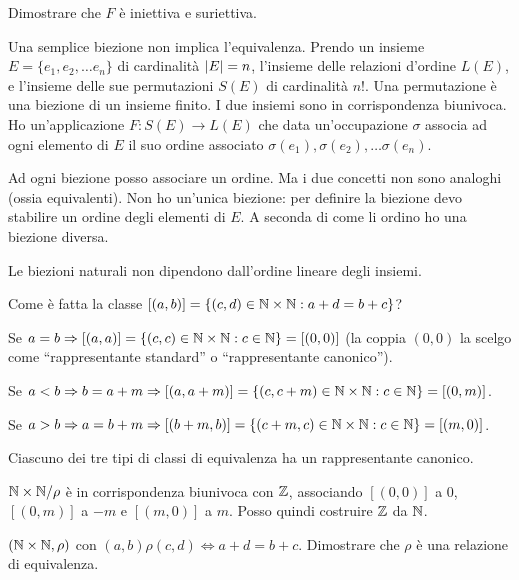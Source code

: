 \begin{esercizio}
Dimostrare che $F$ \`e iniettiva e suriettiva.
\end{esercizio}

Una semplice biezione non implica l'equivalenza. Prendo un insieme $E = \{e_1, e_2, \dots e_n\}$ di cardinalit\`a $\left\lvert{E}\right\rvert = n$, l'insieme delle relazioni d'ordine $L(E)$, e l'insieme delle sue permutazioni $S(E)$ di cardinalit\`a $n!$. Una permutazione \`e una biezione di un insieme finito. I due insiemi sono in corrispondenza biunivoca. Ho un'applicazione $F : S(E) \to L(E)$ che data un'occupazione $\sigma$ associa ad ogni elemento di $E$ il suo ordine associato $\sigma(e_1), \sigma(e_2), \dots \sigma(e_n)$. 

Ad ogni biezione posso associare un ordine. Ma i due concetti non sono analoghi (ossia equivalenti). Non ho un'unica biezione: per definire la biezione devo stabilire un ordine degli elementi di $E$. A seconda di come li ordino ho una biezione diversa.

\begin{defn}
Le biezioni naturali non dipendono dall'ordine lineare degli insiemi.
\end{defn}

Come \`e fatta la classe $[(a,b)] = \left \{ (c,d) \in \mathbb{N} \times \mathbb{N} : a + d = b + c \right\}$?

Se $a = b \Rightarrow [(a,a)] = \left \{ (c,c) \in \mathbb{N} \times \mathbb{N} : c \in \mathbb{N} \right\} = [(0,0)]$ (la coppia $(0,0)$ la scelgo come ``rappresentante standard'' o ``rappresentante canonico'').

Se $a < b \Rightarrow b = a + m \Rightarrow [(a,a+m)] = \left \{ (c, c + m) \in \mathbb{N} \times \mathbb{N} : c \in \mathbb{N}\right\} = [(0,m)]$.

Se $a > b \Rightarrow a = b + m \Rightarrow [(b + m, b)] = \left \{ (c + m, c) \in \mathbb{N} \times \mathbb{N} : c \in \mathbb{N}\right\} = [(m,0)]$.

Ciascuno dei tre tipi di classi di equivalenza ha un rappresentante canonico.

$\mathbb{N} \times \mathbb{N} / \rho$ \`e in corrispondenza biunivoca con $\mathbb{Z}$, associando $[(0,0)]$ a 0, $[(0,m)]$ a $-m$ e $[(m,0)]$ a $m$. Posso quindi costruire $\mathbb{Z}$ da $\mathbb{N}$.

\begin{esercizio}
$(\mathbb{N} \times \mathbb{N}, \rho)$ con $(a,b) \rho (c,d) \iff a + d = b + c$. Dimostrare che $\rho$ \`e una relazione di equivalenza.
\end{esercizio}


